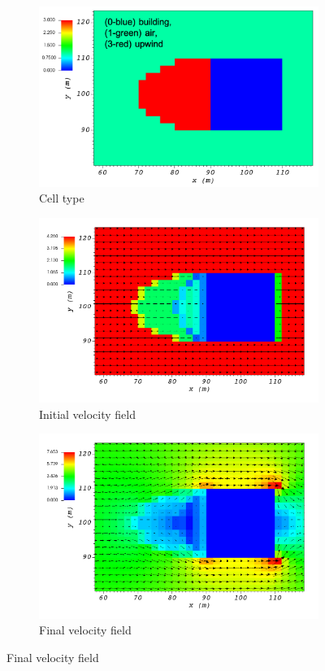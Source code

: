 \documentclass[14pt,landscape]{report}
\begin{document}
\begin{figure}[p]
    \centering
    \begin{subfigure}[t]{0.45\textwidth}
    \centering
    \includegraphics[width=10.3cm,keepaspectratio]{Images/upwind_z_5_2_init_icell.png}
    \caption{Cell type}
    \end{subfigure}
    \begin{subfigure}[t]{0.45\textwidth}
    \centering
    \includegraphics[width=11.0cm,keepaspectratio]{Images/upwind_z_5_2_init_vel.png}
    \caption{Initial velocity field}
    \end{subfigure}
    \begin{subfigure}[t]{0.45\textwidth}
    \centering
    \includegraphics[width=11.0cm,keepaspectratio]{Images/upwind_z_5_2_final.png}
    \caption{Final velocity field}
    \end{subfigure}
\end{figure}
\end{document}

